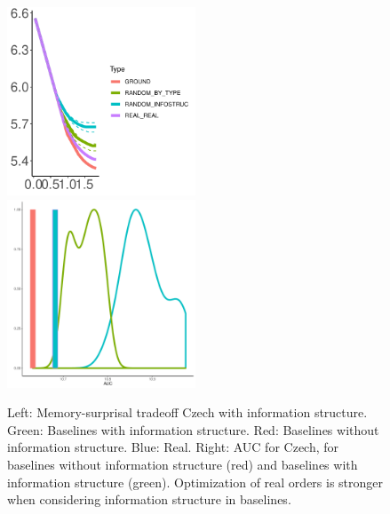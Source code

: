 	
\begin{figure}
\includegraphics[width=0.5\textwidth]{figures/Czech-PDT-listener-surprisal-memory-MEDIANS_onlyWordForms_boundedVocab.pdf}
\includegraphics[width=0.5\textwidth]{figures/Czech-PDT-listener-surprisal-memory-HIST_AUC_onlyWordForms_boundedVocab_REAL-infostruc.pdf}

	\caption{Left: Memory-surprisal tradeoff Czech with information structure. Green: Baselines with information structure. Red: Baselines without information structure. Blue: Real. Right: AUC for Czech, for baselines without information structure (red) and baselines with information structure (green). Optimization of real orders is stronger when considering information structure in baselines. }\label{fig:median-czech-infostruc}
\end{figure}


